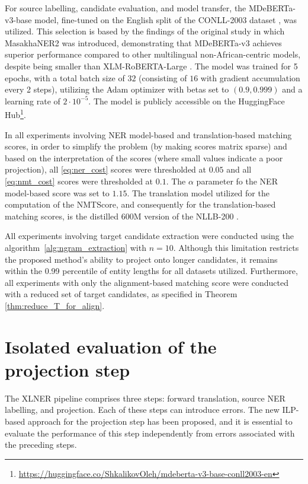 For source labelling, candidate evaluation, and model transfer, the MDeBERTa-v3-base \cite{He2021DeBERTaV3ID}
model, fine-tuned on the English split of the CONLL-2003 dataset \cite{tjong-kim-sang-de-meulder-2003-introduction-conll},
was utilized. This selection is based by the findings of the original study in which
MasakhaNER2 was introduced, demonstrating that MDeBERTa-v3 achieves superior performance
compared to other multilingual non-African-centric models, despite being smaller than
XLM-RoBERTA-Large \cite{conneau-etal-2020-unsupervised-xlmr}. The model was trained
for 5 epochs, with a total batch size of \( 32 \) (consisting of \( 16 \) with gradient
accumulation every 2 steps), utilizing the Adam optimizer \cite{Kingma2014AdamAM} with
betas set to \( (0.9,0.999) \) and a learning rate of \( 2 \cdot 10^{-5} \). The model
is publicly accessible on the HuggingFace Hub\footnote{\url{https://huggingface.co/ShkalikovOleh/mdeberta-v3-base-conll2003-en}}.

In all experiments involving NER model-based and translation-based matching scores,
in order to simplify the problem (by making scores matrix sparse) and based on the interpretation of the scores
(where small values indicate a poor projection), all \eqref{eq:ner_cost} scores were
thresholded at \( 0.05 \) and all \eqref{eq:nmt_cost} scores were thresholded
at \( 0.1 \). The \( \alpha \) parameter fo the NER model-based score was set to \( 1.15 \).
The translation model utilized for the computation of the NMTScore, and consequently
for the translation-based matching scores, is the distilled 600M version of the NLLB-200 \cite{nllbteam2022languageleftbehindscaling}.

All experiments involving target candidate extraction were conducted using the
algorithm~\ref{alg:ngram_extraction} with \( n = 10 \). Although this limitation restricts the proposed method's
ability to project onto longer candidates, it remains within the 0.99 percentile of entity lengths
for all datasets utilized. Furthermore, all experiments with only the alignment-based matching
score were conducted with a reduced set of target candidates, as specified in Theorem \ref{thm:reduce_T_for_align}.

\section{Isolated evaluation of the projection step}
The XLNER pipeline comprises three steps: forward translation, source NER labelling,
and projection. Each of these steps can introduce errors. The new ILP-based approach for the
projection step has been proposed, and it is essential to evaluate the performance
of this step independently from errors associated with the preceding steps.

